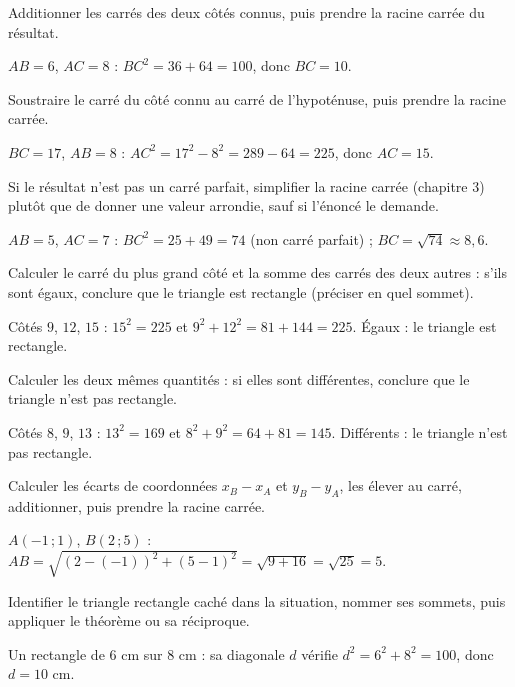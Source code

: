 Additionner les carrés des deux côtés connus, puis prendre la racine carrée du résultat.
\begin{exemple}
$AB=6$, $AC=8$ : $BC^{2}=36+64=100$, donc $BC=10$.
\end{exemple}

Soustraire le carré du côté connu au carré de l'hypoténuse, puis prendre la racine carrée.
\begin{exemple}
$BC=17$, $AB=8$ : $AC^{2}=17^{2}-8^{2}=289-64=225$, donc $AC=15$.
\end{exemple}

Si le résultat n'est pas un carré parfait, simplifier la racine carrée (chapitre 3) plutôt
que de donner une valeur arrondie, sauf si l'énoncé le demande.
\begin{exemple}
$AB=5$, $AC=7$ : $BC^{2}=25+49=74$ (non carré parfait) ; $BC=\sqrt{74}\approx8{,}6$.
\end{exemple}

Calculer le carré du plus grand côté et la somme des carrés des deux autres : s'ils sont
égaux, conclure que le triangle est rectangle (préciser en quel sommet).
\begin{exemple}
Côtés $9$, $12$, $15$ : $15^{2}=225$ et $9^{2}+12^{2}=81+144=225$. Égaux : le triangle est
rectangle.
\end{exemple}

Calculer les deux mêmes quantités : si elles sont différentes, conclure que le triangle
n'est pas rectangle.
\begin{exemple}
Côtés $8$, $9$, $13$ : $13^{2}=169$ et $8^{2}+9^{2}=64+81=145$. Différents : le triangle
n'est pas rectangle.
\end{exemple}

Calculer les écarts de coordonnées $x_B-x_A$ et $y_B-y_A$, les élever au carré, additionner,
puis prendre la racine carrée.
\begin{exemple}
$A(-1\,;1)$, $B(2\,;5)$ : $AB=\sqrt{(2-(-1))^{2}+(5-1)^{2}}=\sqrt{9+16}=\sqrt{25}=5$.
\end{exemple}

Identifier le triangle rectangle caché dans la situation, nommer ses sommets, puis
appliquer le théorème ou sa réciproque.
\begin{exemple}
Un rectangle de $6$ cm sur $8$ cm : sa diagonale $d$ vérifie $d^{2}=6^{2}+8^{2}=100$, donc
$d=10$ cm.
\end{exemple}

